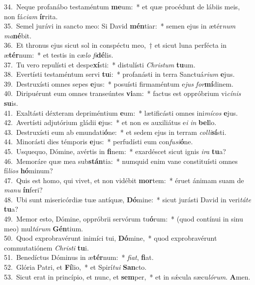 {34.~}Neque profanábo testaméntum \textbf{me}um:~* et quæ procédunt de lábiis meis, non fá\textit{ci}\textit{am} \textbf{ír}rita.\\
{35.~}Semel jurávi in sancto meo: Si David \textbf{mén}tiar:~* semen ejus in ætér\textit{num} \textit{ma}\textbf{né}bit.\\
{36.~}Et thronus ejus sicut sol in conspéctu meo,~† et sicut luna perfécta in æ\textbf{tér}num:~* et testis in cæ\textit{lo} \textit{fi}\textbf{dé}lis.\\
{37.~}Tu vero repulísti et despe\textbf{xí}sti:~* distulísti \textit{Chri}\textit{stum} \textbf{tu}um.\\
{38.~}Evertísti testaméntum servi \textbf{tu}i:~* profanásti in terra Sanctuá\textit{ri}\textit{um} \textbf{e}jus.\\
{39.~}Destruxísti omnes sepes \textbf{e}jus:~* posuísti firmaméntum e\textit{jus} \textit{for}\textbf{mí}dinem.\\
{40.~}Diripuérunt eum omnes transeúntes \textbf{vi}am:~* factus est oppróbrium vi\textit{cí}\textit{nis} \textbf{su}is.\\
{41.~}Exaltásti déxteram depriméntium \textbf{e}um:~* lætificásti omnes ini\textit{mí}\textit{cos} \textbf{e}jus.\\
{42.~}Avertísti adjutórium gládii \textbf{e}jus:~* et non es auxiliátus e\textit{i} \textit{in} \textbf{bel}lo.\\
{43.~}Destruxísti eum ab emundati\textbf{ó}ne:~* et sedem ejus in terram \textit{col}\textit{li}\textbf{sí}sti.\\
{44.~}Minorásti dies témporis \textbf{e}jus:~* perfudísti eum con\textit{fu}\textit{si}\textbf{ó}ne.\\
{45.~}Usquequo, Dómine, avértis in \textbf{fi}nem:~* exardéscet sicut ignis \textit{i}\textit{ra} \textbf{tu}a?\\
{46.~}Memoráre quæ mea sub\textbf{stán}tia:~* numquid enim vane constituísti omnes fí\textit{li}\textit{os} \textbf{hó}minum?\\
{47.~}Quis est homo, qui vivet, et non vidébit \textbf{mor}tem:~* éruet ánimam suam de \textit{ma}\textit{nu} \textbf{ín}feri?\\
{48.~}Ubi sunt misericórdiæ tuæ antíquæ, \textbf{Dó}mine:~* sicut jurásti David in veri\textit{tá}\textit{te} \textbf{tu}a?\\
{49.~}Memor esto, Dómine, oppróbrii servórum tu\textbf{ó}rum:~* (quod contínui in sinu meo) mul\textit{tá}\textit{rum} \textbf{Gén}tium.\\
{50.~}Quod exprobravérunt inimíci tui, \textbf{Dó}mine,~* quod exprobravérunt commutatiónem \textit{Chri}\textit{sti} \textbf{tu}i.\\
{51.~}Benedíctus Dóminus in æ\textbf{tér}num:~* \textit{fi}\textit{at}, \textbf{fi}at.\\
{52.~}Glória Patri, et \textbf{Fí}lio,~* et Spirí\textit{tu}\textit{i} \textbf{San}cto.\\
{53.~}Sicut erat in princípio, et nunc, et \textbf{sem}per,~* et in sǽcula sæcu\textit{ló}\textit{rum}. \textbf{A}men.\\
